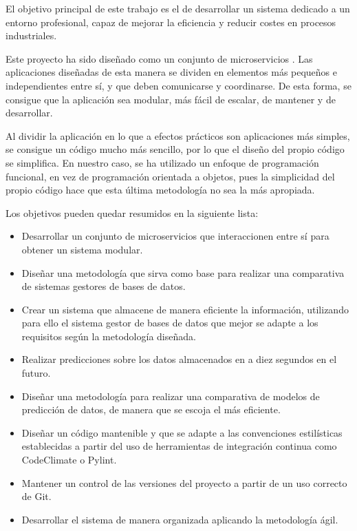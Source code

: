 
El objetivo principal de este trabajo es el de desarrollar un sistema dedicado a un entorno profesional, capaz 
de mejorar la eficiencia y reducir costes en procesos industriales.

Este proyecto ha sido diseñado como un conjunto de microservicios \cite{7030212}. Las aplicaciones diseñadas de esta manera se dividen 
en elementos más pequeños e independientes entre sí, y que deben comunicarse y coordinarse. De esta 
forma, se consigue que la aplicación sea modular, más fácil de escalar, de mantener y de desarrollar.

Al dividir la aplicación en lo que a efectos prácticos son aplicaciones más simples, se consigue un código 
mucho más sencillo, por lo que el diseño del propio código se simplifica. En nuestro caso, se ha utilizado 
un enfoque de programación funcional, en vez de programación orientada a objetos, pues la simplicidad del propio 
código hace que esta última metodología no sea la más apropiada.

Los objetivos pueden quedar resumidos en la siguiente lista:
\begin{itemize}
    \item Desarrollar un conjunto de microservicios que interaccionen entre sí para obtener un sistema modular.
    \item Diseñar una metodología que sirva como base para realizar una comparativa de sistemas gestores de bases de datos.
    \item Crear un sistema que almacene de manera eficiente la información, utilizando para ello el sistema gestor de bases 
        de datos que mejor se adapte a los requisitos según la metodología diseñada.
    \item Realizar predicciones sobre los datos almacenados en a diez segundos en el futuro.
    \item Diseñar una metodología para realizar una comparativa de modelos de predicción de datos, de manera que se escoja el 
        más eficiente.
    \item Diseñar un código mantenible y que se adapte a las convenciones estilísticas establecidas a partir del uso de
        herramientas de integración continua como CodeClimate o Pylint.
    \item Mantener un control de las versiones del proyecto a partir de un uso correcto de Git.
    \item Desarrollar el sistema de manera organizada aplicando la metodología ágil.
\end{itemize}